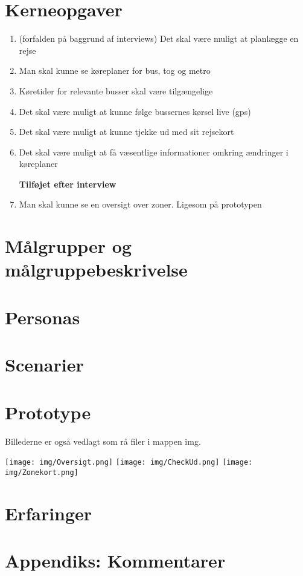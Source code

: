 \documentclass[12pt,a4paper,oneside]{article}
\begin{document}
\section{Kerneopgaver}

\begin{enumerate}
\item {(forfalden på baggrund af interviews) Det skal være muligt at planlægge en rejse}
\item {Man skal kunne se køreplaner for bus, tog og metro}
\item {Køretider for relevante busser skal være tilgængelige}
\item {Det skal være muligt at kunne følge bussernes kørsel live (gps)}
\item {Det skal være muligt at kunne tjekke ud med sit rejsekort}
\item {Det skal være muligt at få væsentlige informationer omkring ændringer i
køreplaner}\newline

\textbf{Tilføjet efter interview}

\item {Man skal kunne se en oversigt over zoner. Ligesom på prototypen}
\end{enumerate}


\section{Målgrupper og målgruppebeskrivelse}
\section{Personas}
\section{Scenarier}
\section{Prototype}
Billederne er også vedlagt som rå filer i mappen img.

\texttt{[image: img/Oversigt.png]}\newpage
\texttt{[image: img/CheckUd.png]}\newpage
\texttt{[image: img/Zonekort.png]}\newpage


\section{Erfaringer}
\section{Appendiks: Kommentarer}
\end{document}
